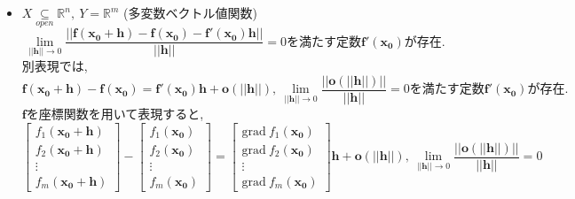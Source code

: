 \documentclass[dvipdfmx]{jsarticle}
\begin{document}
\begin{description}
\begin{itemize}
                    \item $X \underset{open}{\subseteq} \mathbb{R}^n,\ Y = \mathbb{R}^m$ (多変数ベクトル値関数)
                        $$ \lim_{\bm{||h||} \to 0} \dfrac{||\bm{f}(\bm{x_0} + \bm{h}) - \bm{f}(\bm{x_0}) - \bm{f'}(\bm{x_0}) \bm{h} ||}{||\bm{h}||} = 0 \text{を満たす定数} \bm{f'}(\bm{x_0}) \text{が存在.}$$
                        別表現では, 
                        $$\bm{f}(\bm{x_0} + \bm{h}) - \bm{f}(\bm{x_0}) = \bm{f'}(\bm{x_0}) \bm{h} + \bm{o}(||\bm{h}||),\ \lim_{||\bm{h}|| \to 0} \dfrac{||\bm{o}(||\bm{h}||)||}{||\bm{h}||} = 0 \text{を満たす定数} \bm{f'}(\bm{x_0}) \text{が存在.}$$
                        $\bm{f}$を座標関数を用いて表現すると, 
                        $$\begin{bmatrix}
                            f_1(\bm{x_0} + \bm{h}) \\
                            f_2(\bm{x_0} + \bm{h}) \\
                                \vdots \\
                            f_m(\bm{x_0 + \bm{h}})
                        \end{bmatrix}  
                        - 
                        \begin{bmatrix}
                            f_1(\bm{x_0}) \\
                            f_2(\bm{x_0}) \\
                                \vdots \\
                            f_m(\bm{x_0})
                        \end{bmatrix}
                        = 
                        \begin{bmatrix}
                            \mathrm{grad} \ f_1(\bm{x_0}) \\
                            \mathrm{grad} \ f_2(\bm{x_0}) \\
                                \vdots \\
                            \mathrm{grad} \ f_m(\bm{x_0})
                        \end{bmatrix}
                        \bm{h} + \bm{o}(||\bm{h}||),\ \lim_{||\bm{h}|| \to 0} \dfrac{||\bm{o}(||\bm{h}||)||}{||\bm{h}||} = 0 $$


\end{itemize}
\end{description}
\end{document}
